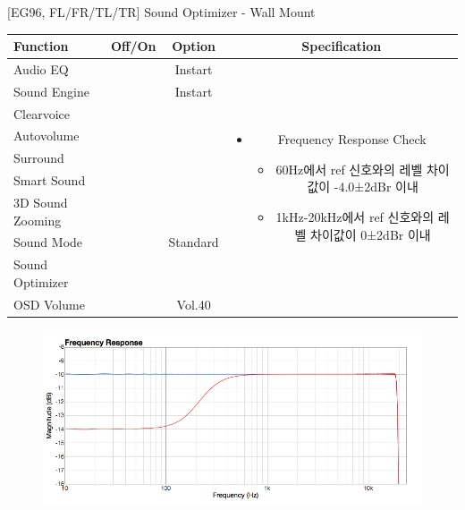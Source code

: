 \documentclass{beamer}
\begin{document}
\begin{frame}[t]{[EG96, FL/FR/TL/TR] Sound Optimizer - Wall Mount}
\begin{tiny}
\begin{tabular}{@{}lccc@{}}
\toprule
Function & Off/On & Option & Specification \\
\midrule
Audio EQ & \color{black}{Off} & Instart &
\multirow{10}{60mm}{
\begin{itemize}
\item Frequency Response Check
	\begin{itemize}
	\item 60Hz에서 ref 신호와의 레벨 차이값이 -4.0±2dBr 이내
	\item 1kHz-20kHz에서 ref 신호와의 레벨 차이값이 0±2dBr 이내
	\end{itemize}
\end{itemize}
} \\
Sound Engine & \color{blue}{On} & Instart & \\
Clearvoice & \color{black}{Off} & & \\
Autovolume & \color{black}{Off} & & \\
Surround & \color{black}{Off} & & \\
Smart Sound & \color{black}{Off} & & \\
3D Sound Zooming & \color{black}{Off} & & \\
Sound Mode & \color{blue}{On} & Standard & \\
Sound Optimizer & \color{blue}{On} & \color{blue}{Wallmount} & \\
OSD Volume & \color{blue}{On} & Vol.40 & \\
\midrule
\end{tabular}
\end{tiny}

\begin{figure}[b]
\includegraphics[height=0.4\textwidth]{figure/EG96/wallmount.png}
\end{figure}

\end{frame}
\end{document}
